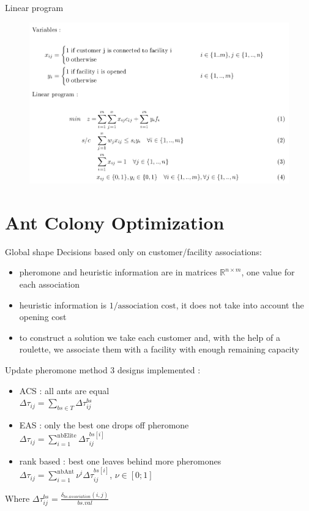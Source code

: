 \documentclass{beamer}
\begin{document}
\begin{frame}{Linear program}
    \begin{figure}
    \centering
    \includegraphics[scale=0.32]{model}
\end{figure}
\end{frame}

\section{Ant Colony Optimization}

\begin{frame}{Global shape}
Decisions based only on customer/facility associations:
\begin{itemize}
\item
pheromone and heuristic information are in matrices $\mathbb{R}^{n \times m}$, one value for each association
\item
heuristic information is $1/ \text{association cost}$, it does not take into account the opening cost
\item
to construct a solution we take each customer and, with the help of a roulette, we associate them with a facility with enough remaining capacity
\end{itemize}
\end{frame}

\begin{frame}{Update pheromone method}
3 designs implemented :
\begin{itemize}
\item
ACS : all ants are equal \\
$\Delta \tau_{ij} = \sum \limits_{bs \in T} \Delta \tau_{ij}^{bs}$
\item
EAS : only the best one drops off pheromone \\
$\Delta \tau_{ij} = \sum \limits_{i = 1}^{\text{nbElite}} \Delta \tau_{ij}^{bs\left[i\right]}$
\item
rank based : best one leaves behind more pheromones \\
$\Delta \tau_{ij} = \sum \limits_{i = 1}^{\text{nbAnt}} \nu^i \Delta \tau_{ij}^{bs\left[ i \right] }$, $\nu \in \left[ 0 ; 1 \right] $
\end{itemize}
Where $\Delta \tau_{ij}^{bs} = \frac{\delta_{bs.association}(i,j)}{bs.val}$
\end{frame}
\end{document}

